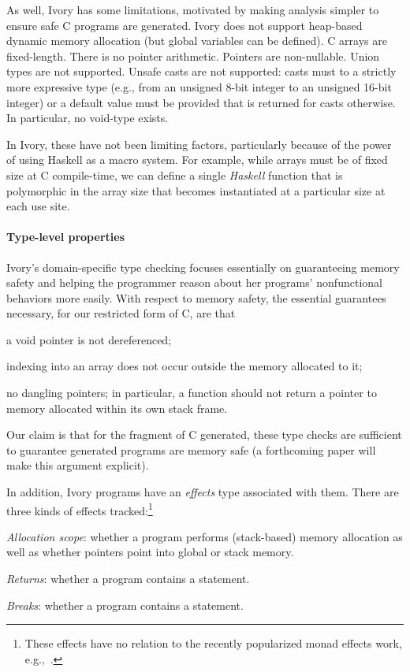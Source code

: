 As well, Ivory has some limitations, motivated by making analysis simpler to
ensure safe C programs are generated.  Ivory does not support heap-based dynamic
memory allocation (but global variables can be defined).  C arrays are
fixed-length.  There is no pointer arithmetic.  Pointers are non-nullable.
Union types are not supported.  Unsafe casts are not supported: casts must to a
strictly more expressive type (e.g., from an unsigned 8-bit integer to an
unsigned 16-bit integer) or a default value must be provided that is returned
for casts otherwise.  In particular, no void-type exists.

In Ivory, these have not been limiting factors, particularly because of the
power of using Haskell as a macro system.  For example, while arrays must be of
fixed size at C compile-time, we can define a single \emph{Haskell} function
that is polymorphic in the array size that becomes instantiated at a particular
size at each use site.  %


\paragraph{Type-level properties}
Ivory's domain-specific type checking focuses essentially on guaranteeing memory
safety and helping the programmer reason about her programs' nonfunctional
behaviors more easily.  With respect to memory safety, the essential
guarantees necessary, for our restricted form of C, are that
\begin{compactitem}
  \item a void pointer is not dereferenced;
  \item indexing into an array does not occur outside the memory allocated to
    it;
  \item no dangling pointers; in particular, a function should not return a
    pointer to memory allocated within its own stack frame.
\end{compactitem}

\noindent
Our claim is that for the fragment of C generated, these type checks are
sufficient to guarantee generated programs are memory safe (a forthcoming paper
will make this argument explicit).

In addition, Ivory programs have an \emph{effects} type associated with them.
There are three kinds of effects tracked:\footnote{These effects have no
  relation to the recently popularized monad effects work, e.g.,~\cite{}.}
\begin{compactitem}
  \item \emph{Allocation scope}: whether a program performs (stack-based)
    memory allocation as well as whether pointers point into global or stack memory.
  \item \emph{Returns}: whether a program contains a  statement.
  \item \emph{Breaks}: whether a program contains a 
    statement.
\end{compactitem}

